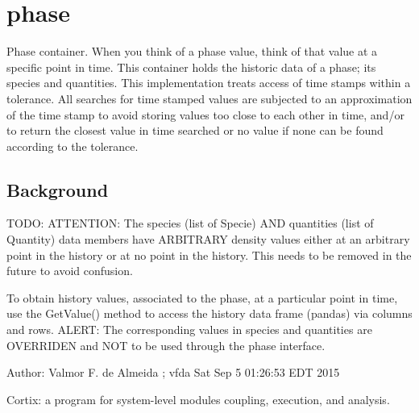 \documentclass[letterpaper,10pt,openany,oneside,english]{sphinxmanual}
\begin{document}
\section{phase}
\label{\detokenize{support_rst/phase:module-phase}}\label{\detokenize{support_rst/phase:phase}}\label{\detokenize{support_rst/phase::doc}}
Phase  container. When you think of a phase value, think of that value at
a specific point in time. This container holds the historic data of a phase;
its species and quantities. This implementation treats access of time stamps within
a tolerance. All searches for time stamped values are subjected to an approximation
of the time stamp to avoid storing values too close to each other in time, and/or to
return the closest value in time searched or no value if none can be found according
to the tolerance.


\subsection{Background}
\label{\detokenize{support_rst/phase:background}}
TODO: ATTENTION:
The species (list of Specie) AND quantities (list of Quantity) data members
have ARBITRARY density values either at an arbitrary point in the history or at
no point in the history. This needs to be removed in the future to avoid confusion.

To obtain history values, associated to the phase, at a particular point in time,
use the GetValue() method to access the history data frame (pandas) via columns and
rows. ALERT: The corresponding values in species and quantities are OVERRIDEN and NOT to
be used through the phase interface.

Author: Valmor F. de Almeida ; vfda
Sat Sep  5 01:26:53 EDT 2015

Cortix: a program for system-level modules coupling, execution, and analysis.
\end{document}
